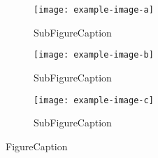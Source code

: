 \begin{figure}[!h]
     \centering
     \begin{subfigure}[b]{0.32\textwidth}
         \centering
         \texttt{[image: example-image-a]}
         \caption{SubFigureCaption}
     \end{subfigure}
     \hfill
     \begin{subfigure}[b]{0.32\textwidth}
         \centering
         \texttt{[image: example-image-b]}
         \caption{SubFigureCaption}
     \end{subfigure}
     \hfill
     \begin{subfigure}[b]{0.32\textwidth}
         \centering
         \texttt{[image: example-image-c]}
         \caption{SubFigureCaption}
     \end{subfigure}
     \caption{FigureCaption}
\end{figure}